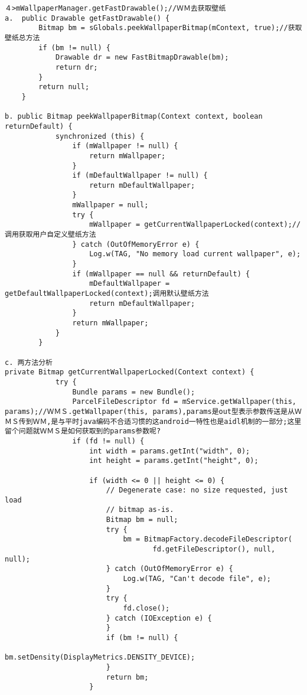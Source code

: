 \documentclass[a4paper,11pt,twoside,openany]{article}%
\begin{document}
\begin{CJK}{UTF8}{song}
\begin{verbatim}
４>mWallpaperManager.getFastDrawable();//ＷＭ去获取壁纸 
a.  public Drawable getFastDrawable() { 
        Bitmap bm = sGlobals.peekWallpaperBitmap(mContext, true);//获取壁纸总方法 
        if (bm != null) { 
            Drawable dr = new FastBitmapDrawable(bm); 
            return dr; 
        } 
        return null; 
    } 

b. public Bitmap peekWallpaperBitmap(Context context, boolean returnDefault) { 
            synchronized (this) { 
                if (mWallpaper != null) { 
                    return mWallpaper; 
                } 
                if (mDefaultWallpaper != null) { 
                    return mDefaultWallpaper; 
                } 
                mWallpaper = null; 
                try { 
                    mWallpaper = getCurrentWallpaperLocked(context);//调用获取用户自定义壁纸方法 
                } catch (OutOfMemoryError e) { 
                    Log.w(TAG, "No memory load current wallpaper", e); 
                } 
                if (mWallpaper == null && returnDefault) { 
                    mDefaultWallpaper = getDefaultWallpaperLocked(context);调用默认壁纸方法 
                    return mDefaultWallpaper; 
                } 
                return mWallpaper; 
            } 
        } 

c. 两方法分析 
private Bitmap getCurrentWallpaperLocked(Context context) { 
            try { 
                Bundle params = new Bundle(); 
                ParcelFileDescriptor fd = mService.getWallpaper(this, params);//ＷＭＳ.getWallpaper(this, params),params是out型表示参数传送是从ＷＭＳ传到ＷＭ,是与平时java编码不合适习惯的这android一特性也是aidl机制的一部分;这里留个问题就ＷＭＳ是如何获取到的params参数呢? 
                if (fd != null) { 
                    int width = params.getInt("width", 0); 
                    int height = params.getInt("height", 0); 
                    
                    if (width <= 0 || height <= 0) { 
                        // Degenerate case: no size requested, just load 
                        // bitmap as-is. 
                        Bitmap bm = null; 
                        try { 
                            bm = BitmapFactory.decodeFileDescriptor( 
                                   fd.getFileDescriptor(), null, null); 
                        } catch (OutOfMemoryError e) { 
                            Log.w(TAG, "Can't decode file", e); 
                        } 
                        try { 
                            fd.close(); 
                        } catch (IOException e) { 
                        } 
                        if (bm != null) { 
                            bm.setDensity(DisplayMetrics.DENSITY_DEVICE); 
                        } 
                        return bm; 
                    } 
                    

\end{verbatim}
\end{CJK}
\end{document}
